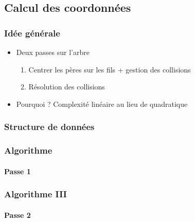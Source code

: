 \subsection{Calcul des coordonnées}

\begin{frame}
	\frametitle{Idée générale}
	\begin{itemize}
		\item Deux passes sur l'arbre
		\begin{enumerate}
			\item Centrer les pères sur les fils + gestion des collisions
			\item Résolution des collisions
		\end{enumerate}
		\item Pourquoi ? Complexité linéaire au lieu de quadratique
	\end{itemize}
\end{frame}

\begin{frame}
	\frametitle{Structure de données}
	
\end{frame}

\begin{frame}[allowframebreaks]
	\frametitle{Algorithme}
	\framesubtitle{Passe 1}
	
\end{frame}

\begin{frame}
	\frametitle{Algorithme III}
	\framesubtitle{Passe 2}
	
\end{frame}

%    


